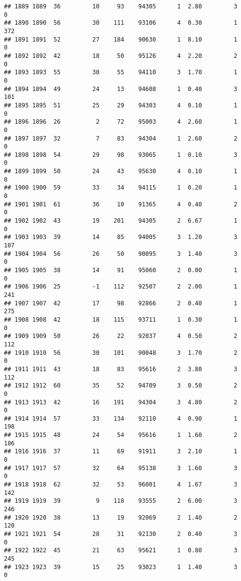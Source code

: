 \documentclass[
]{article}
\begin{document}
\begin{verbatim}
## 1889 1889  36         10     93    94305      1  2.80         3        0
## 1890 1890  56         30    111    93106      4  0.30         1      372
## 1891 1891  52         27    184    90630      1  8.10         1        0
## 1892 1892  42         18     50    95126      4  2.20         2        0
## 1893 1893  55         30     55    94110      3  1.70         1        0
## 1894 1894  49         24     13    94608      1  0.40         3      101
## 1895 1895  51         25     29    94303      4  0.10         1        0
## 1896 1896  26          2     72    95003      4  2.60         1        0
## 1897 1897  32          7     83    94304      1  2.60         2        0
## 1898 1898  54         29     98    93065      1  0.10         3        0
## 1899 1899  50         24     43    95630      4  0.10         1        0
## 1900 1900  59         33     34    94115      1  0.20         1        0
## 1901 1901  61         36     10    91365      4  0.40         2        0
## 1902 1902  43         19    201    94305      2  6.67         1        0
## 1903 1903  39         14     85    94005      3  1.20         3      107
## 1904 1904  56         26     50    90095      3  1.40         3        0
## 1905 1905  38         14     91    95060      2  0.00         1        0
## 1906 1906  25         -1    112    92507      2  2.00         1      241
## 1907 1907  42         17     98    92866      2  0.40         1      275
## 1908 1908  42         18    115    93711      1  0.30         1        0
## 1909 1909  50         26     22    92037      4  0.50         2      112
## 1910 1910  56         30    101    90048      3  1.70         2        0
## 1911 1911  43         18     83    95616      2  3.80         3      112
## 1912 1912  60         35     52    94709      3  0.50         2        0
## 1913 1913  42         16    191    94304      3  4.80         2        0
## 1914 1914  57         33    134    92110      4  0.90         1      198
## 1915 1915  48         24     54    95616      1  1.60         2      186
## 1916 1916  37         11     69    91911      3  2.10         1        0
## 1917 1917  57         32     64    95138      3  1.60         3        0
## 1918 1918  62         32     53    96001      4  1.67         3      142
## 1919 1919  39          9    118    93555      2  6.00         3      246
## 1920 1920  38         13     19    92069      2  1.40         2      120
## 1921 1921  54         28     31    92130      2  0.40         3        0
## 1922 1922  45         21     63    95621      1  0.80         3      245
## 1923 1923  39         15     25    93023      1  1.40         3        0

\end{verbatim}
\end{document}
